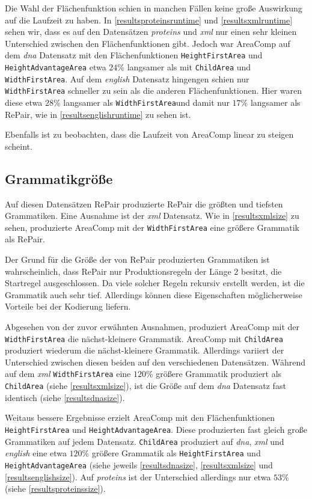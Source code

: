 Die Wahl der Flächenfunktion schien in manchen Fällen keine große Auswirkung auf die Laufzeit zu haben. In \autoref{resultsproteinsruntime} und \autoref{resultsxmlruntime} sehen wir, dass es auf den Datensätzen \emph{proteins} und \emph{xml} nur einen sehr kleinen Unterschied zwischen den Flächenfunktionen gibt. 
Jedoch war AreaComp auf dem \emph{dna} Datensatz mit den Flächenfunktionen \texttt{HeightFirstArea} und \texttt{HeightAdvantageArea} etwa $24$\% langsamer als mit \texttt{ChildArea} und \texttt{WidthFirstArea}. Auf dem \emph{english} Datensatz hingengen schien nur \texttt{WidthFirstArea} schneller zu sein als die anderen Flächenfunktionen. Hier waren diese etwa $28$\% langsamer als \texttt{WidthFirstArea}und damit nur $17$\% langsamer als RePair, wie in \autoref{resultsenglishruntime} zu sehen ist.

Ebenfalls ist zu beobachten, dass die Laufzeit von AreaComp linear zu steigen scheint.

\subsection{Grammatikgröße}
\label{grammarsize}

Auf diesen Datensätzen RePair produzierte RePair die größten und tiefsten Grammatiken. Eine Ausnahme ist der \emph{xml} Datensatz. Wie in \autoref{resultsxmlsize} zu sehen, produzierte AreaComp mit der \texttt{WidthFirstArea} eine größere Grammatik als RePair.

Der Grund für die Größe der von RePair produzierten Grammatiken ist wahrscheinlich, dass RePair nur Produktionsregeln der Länge $2$ besitzt, die Startregel ausgeschlossen. Da viele solcher Regeln rekursiv erstellt werden, ist die Grammatik auch sehr tief. Allerdings können diese Eigenschaften möglicherweise Vorteile bei der Kodierung liefern. \cite{tabei_succinct_2013}

Abgesehen von der zuvor erwähnten Ausnahmen, produziert AreaComp mit der\\
\texttt{WidthFirstArea} die nächst-kleinere Grammatik. AreaComp mit \texttt{ChildArea} produziert wiederum die nächst-kleinere Grammatik. Allerdings variiert der Unterschied zwischen diesen beiden auf den verschiedenen Datensätzen. Während auf dem \emph{xml} \texttt{WidthFirstArea} eine $120$\% größere Grammatik produziert als \texttt{ChildArea} (siehe \autoref{resultsxmlsize}), ist die Größe auf dem \emph{dna} Datensatz fast identisch (siehe \autoref{resultsdnasize}).

Weitaus bessere Ergebnisse erzielt AreaComp mit den Flächenfunktionen \\
\texttt{HeightFirstArea} und \texttt{HeightAdvantageArea}.
Diese produzierten fast gleich große Grammatiken auf jedem Datensatz. \texttt{ChildArea} produziert auf \emph{dna}, \emph{xml} und \emph{english} eine etwa $120$\% größere Grammatik als \texttt{HeightFirstArea} und \texttt{HeightAdvantageArea} (siehe jeweils \autoref{resultsdnasize}, \autoref{resultsxmlsize} und \autoref{resultsenglishsize}). Auf \emph{proteins} ist der Unterschied allerdings nur etwa $53$\% (siehe \autoref{resultsproteinssize}).

